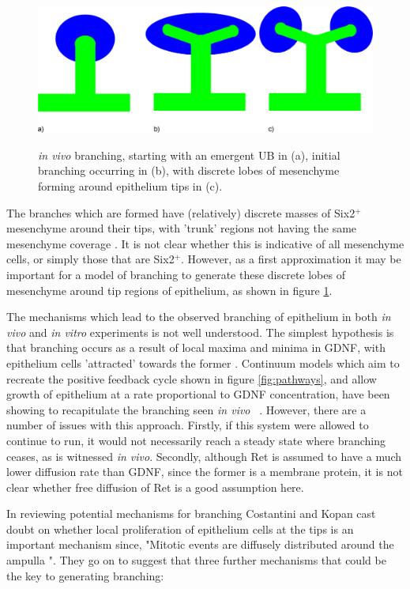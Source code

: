 \documentclass[pdftex,10pt,a4paper,twocolumn]{article}
\begin{document}
\begin{figure}[t] 
\centering
\scalebox{0.2} 
{\includegraphics{UB_branch.eps}}
\caption{\textit{in vivo} branching, starting with an emergent UB in (a), initial branching occurring in (b), with discrete lobes of mesenchyme forming around epithelium tips in (c).}\label{fig:branch}
\end{figure} 

The branches which are formed have (relatively) discrete masses of Six2$^+$ mesenchyme around their tips, with 'trunk' regions not having the same mesenchyme coverage \cite{short2014global}. It is not clear whether this is indicative of all mesenchyme cells, or simply those that are Six2$^+$. However, as a first approximation it may be important for a model of branching to generate these discrete lobes of mesenchyme around tip regions of epithelium, as shown in figure \ref{fig:branch}. 

The mechanisms which lead to the observed branching of epithelium in both \textit{in vivo} and \textit{in vitro} experiments is not well understood. The simplest hypothesis is that branching occurs as a result of local maxima and minima in GDNF, with epithelium cells 'attracted' towards the former \cite{sariola2003novel}. Continuum models which aim to recreate the positive feedback cycle shown in figure \ref{fig:pathways}, and allow growth of epithelium at a rate proportional to GDNF concentration, have been showing to recapitulate the branching seen \textit{in vivo} ~\cite{MenshykauDIber}. However, there are a number of issues with this approach. Firstly, if this system were allowed to continue to run, it would not necessarily reach a steady state where branching ceases, as is witnessed \textit{in vivo}. Secondly, although Ret is assumed to have a much lower diffusion rate than GDNF, since the former is a membrane protein, it is not clear whether free diffusion of Ret is a good assumption here. 

In reviewing potential mechanisms for branching Costantini and Kopan \cite{CostantiniFKopan2010} cast doubt on whether local proliferation of epithelium cells at the tips is an important mechanism since, "Mitotic events are diffusely distributed around the ampulla \cite{michael2004pattern}". They go on to suggest that three further mechanisms that could be the key to generating branching:
\end{document}
